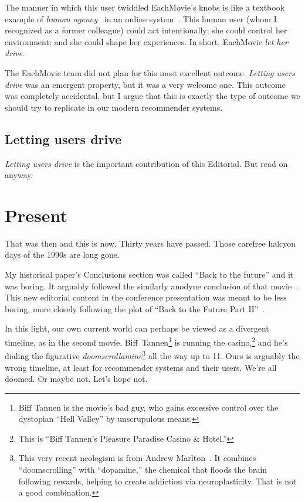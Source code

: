 \documentclass[nonacm,manuscript,screen,microtype={protrusion=true,expansion,kerning,spacing}]{acmart}
\begin{document}
The manner in which this user twiddled EachMovie's knobs is like a textbook example of \emph{human agency}~\cite{Bandura2001Agency} in an online system~\cite{Sundar2020}. This human user (whom I recognized as a former colleague) could act intentionally; she could control her environment; and she could shape her experiences. In short, EachMovie \emph{let her drive.}

The EachMovie team did not plan for this most excellent outcome. \emph{Letting users drive} was an emergent property, but it was a very welcome one. This outcome was completely accidental, but I argue that this is exactly the type of outcome we should try to replicate in our modern recommender systems.

\subsection{Letting users drive}

\emph{Letting users drive} is the important contribution of this Editorial. But read on anyway.

\pagebreak

\section{Present}

That was then and this is now. Thirty years have passed. Those carefree halcyon days of the 1990s are long gone.

My historical paper's Conclusions section was called ``Back to the future'' and it was boring. It arguably followed the similarly anodyne conclusion of that movie~\cite{Zemeckis1985BTTF}. This new editorial content in the conference presentation was meant to be less boring, more closely following the plot of ``Back to the Future Part II''~\cite{Zemeckis1989BTTF2}.

In this light, our own current world can perhaps be viewed as a divergent timeline, as in the second movie. Biff~Tannen\footnote{Biff Tannen is the movie's bad guy, who gains excessive control over the dystopian ``Hell Valley'' by unscrupulous means.} is running the casino,\footnote{This is ``Biff Tannen's Pleasure Paradise Casino \& Hotel.''} and he's dialing the figurative \emph{doomscrollamine}\footnote{This very recent neologism is from Andrew Marlton~\cite{Marlton2026Doomscrollamine}. It combines ``doomscrolling'' with ``dopamine,'' the chemical that floods the brain following rewards, helping to create addiction via neuroplasticity. That is not a good combination.} all the way up to 11. Ours is arguably the wrong timeline, at least for recommender systems and their users. We're all doomed. Or maybe not. Let's hope not.
\end{document}
